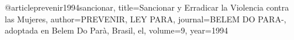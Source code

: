 @article{prevenir1994sancionar,
  title={Sancionar y Erradicar la Violencia contra las Mujeres},
  author={PREVENIR, LEY PARA},
  journal={BELEM DO PARA-, adoptada en Belem Do Par{\`a}, Brasil, el},
  volume={9},
  year={1994}
}